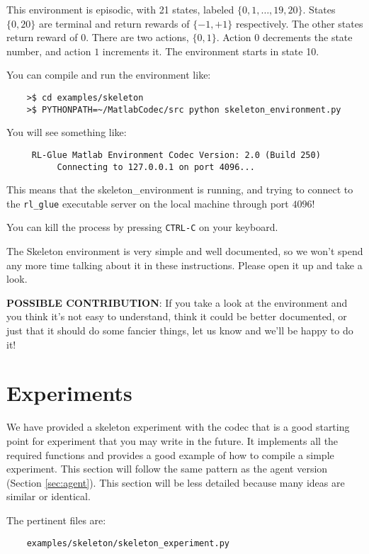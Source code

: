 \documentclass[11pt]{article}
\begin{document}
This environment is episodic, with 21 states, labeled $\{0, 1,\ldots,19,20\}$. States $\{0, 20\}$ are terminal and return rewards of $\{-1, +1\}$ respectively.  The other states return reward of $0$.
There are two actions, $\{0, 1\}$.  Action $0$ decrements the state number, and action $1$ increments it. The environment starts in state 10.

You can compile and run the environment like:
\begin{verbatim}
	>$ cd examples/skeleton
	>$ PYTHONPATH=~/MatlabCodec/src python skeleton_environment.py
\end{verbatim}

You will see something like:
\begin{verbatim}
     RL-Glue Matlab Environment Codec Version: 2.0 (Build 250)
          Connecting to 127.0.0.1 on port 4096...
\end{verbatim}

This means that the skeleton\_environment is running, and trying to connect to the \texttt{rl\_glue} executable server on the local machine through port $4096$! 

You can kill the process by pressing \texttt{CTRL-C} on your keyboard.


The Skeleton environment is very simple and well documented, so we won't spend any more time talking about it in these instructions.
Please open it up and take a look.

\textbf{POSSIBLE CONTRIBUTION}: If you take a look at the environment and you think it's not easy to understand, think it could be better documented, 
or just that it should do some fancier things, let us know and we'll be happy to do it!


\section{Experiments}
We have provided a skeleton experiment with the codec that is a good starting point for experiment that you may write in the future.
It implements all the required functions and provides a good example of how to compile a simple experiment.  This section will follow the same 
pattern as the agent version (Section \ref{sec:agent}).  This section will be less detailed because many ideas are similar or identical.

The pertinent files are:
\begin{verbatim}
	examples/skeleton/skeleton_experiment.py
\end{verbatim}
\end{document}
